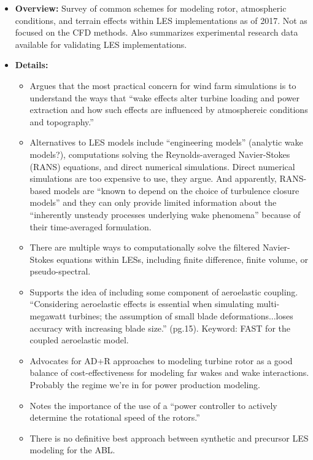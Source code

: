 \documentclass[12pt]{article}
\begin{document}
\begin{itemize}
    \item \textbf{Overview:} Survey of common schemes for modeling rotor,
        atmospheric conditions, and terrain effects within LES implementations
        as of 2017. Not as focused on the CFD methods. Also summarizes
        experimental research data available for validating LES
        implementations.
    \item \textbf{Details:} 
    \begin{itemize}
        \item Argues that the most practical concern for wind farm simulations is to understand
            the ways that ``wake effects alter turbine loading and power extraction and
            how such effects are influenced by atmosphereic conditions and topography.''
        \item Alternatives to LES models include ``engineering models''
            (analytic wake models?), computations solving the Reynolds-averaged
            Navier-Stokes (RANS) equations, and direct numerical simulations.
            Direct numerical simulations are too expensive to use, they argue.
            And apparently, RANS-based models are ``known to depend on the choice
            of turbulence closure models'' and they can only provide limited
            information about the ``inherently unsteady processes underlying wake phenomena''
            because of their time-averaged formulation.
        \item There are multiple ways to computationally solve the filtered Navier-Stokes equations
            within LESs, including finite difference, finite volume, or pseudo-spectral.
        \item Supports the idea of including some component of aeroelastic
            coupling. ``Considering aeroelastic effects is essential when
            simulating multi-megawatt turbines; the assumption of small blade
            deformations...loses accuracy with increasing blade size.'' (pg.15).
            Keyword: FAST for the coupled aeroelastic model.
        \item Advocates for AD+R approaches to modeling turbine rotor as a good
            balance of cost-effectiveness for modeling far wakes and wake
            interactions. Probably the regime we're in for power production modeling.
        \item Notes the importance of the use of a ``power controller to actively determine
            the rotational speed of the rotors.''
        \item There is no definitive best approach between synthetic and precursor LES modeling
            for the ABL.
    \end{itemize}
\end{itemize}
\end{document}
